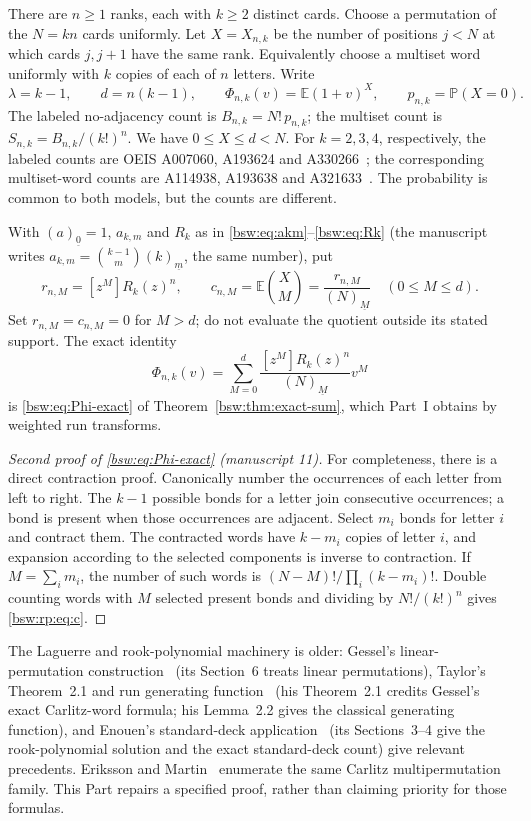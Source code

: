 \documentclass[11pt,letterpaper]{article}
\theoremstyle{definition}
\theoremstyle{remark}
\newcommand{\EE}{\mathbb E}
\newcommand{\PP}{\mathbb P}
\newcommand{\fall}[2]{(#1)_{\underline{#2}}}
\newcommand{\coef}[2]{[#1]#2}
\begin{document}
There are $n\ge1$ ranks, each with $k\ge2$ distinct cards.  Choose a
permutation of the $N=kn$ cards uniformly.  Let $X=X_{n,k}$ be the number
of positions $j<N$ at which cards $j,j+1$ have the same rank.  Equivalently
choose a multiset word uniformly with $k$ copies of each of $n$ letters.
Write
\[
 \lambda=k-1,\qquad d=n(k-1),\qquad
 \Phi_{n,k}(v)=\EE(1+v)^X,\qquad p_{n,k}=\PP(X=0).
\]
The labeled no-adjacency count is $B_{n,k}=N!\,p_{n,k}$; the multiset count
is $S_{n,k}=B_{n,k}/(k!)^n$.  We have $0\le X\le d<N$.  For $k=2,3,4$,
respectively, the labeled counts are OEIS A007060, A193624 and
A330266~\cite{oeis007060,oeis193624,oeis330266}; the corresponding
multiset-word counts are A114938, A193638 and
A321633~\cite{oeis114938,oeis193638,oeis321633}.  The probability is
common to both models, but the counts are different.

With $\fall a0=1$, $a_{k,m}$ and $R_k$ as in
\eqref{bsw:eq:akm}--\eqref{bsw:eq:Rk} (the manuscript writes
$a_{k,m}=\binom{k-1}m\fall km$, the same number), put
\begin{equation}\label{bsw:rp:eq:c}
 r_{n,M}=\coef{z^M}{R_k(z)^n},\qquad
 c_{n,M}=\EE\binom XM=\frac{r_{n,M}}{\fall NM}\quad(0\le M\le d).
\end{equation}
Set $r_{n,M}=c_{n,M}=0$ for $M>d$; do not evaluate the quotient outside its
stated support.  The exact identity
\[
 \Phi_{n,k}(v)=\sum_{M=0}^d\frac{\coef{z^M}{R_k(z)^n}}{\fall NM}v^M
\]
is \eqref{bsw:eq:Phi-exact} of Theorem~\ref{bsw:thm:exact-sum}, which
Part~I obtains by weighted run transforms.

\begin{proof}[Second proof of \eqref{bsw:eq:Phi-exact} (manuscript 11)]
For completeness, there is a direct contraction proof.  Canonically number
the occurrences of each letter from left to right.  The $k-1$ possible bonds
for a letter join consecutive occurrences; a bond is present when those
occurrences are adjacent.  Select $m_i$ bonds for letter $i$ and contract
them.  The contracted words have $k-m_i$ copies of letter $i$, and expansion
according to the selected components is inverse to contraction.  If
$M=\sum_i m_i$, the number of such words is $(N-M)!/\prod_i(k-m_i)!$.
Double counting words with $M$ selected present bonds and dividing by
$N!/(k!)^n$ gives \eqref{bsw:rp:eq:c}.
\end{proof}

The Laguerre and rook-polynomial machinery is older: Gessel's
linear-permutation construction~\cite{gessel} (its Section~6 treats linear
permutations), Taylor's Theorem~2.1 and run generating
function~\cite{taylor} (his Theorem~2.1 credits Gessel's exact Carlitz-word
formula; his Lemma~2.2 gives the classical generating function), and
Enouen's standard-deck application~\cite{enouen} (its Sections~3--4 give
the rook-polynomial solution and the exact standard-deck count) give
relevant precedents.  Eriksson and Martin~\cite{eriksson-martin} enumerate
the same Carlitz multipermutation family.  This Part repairs a specified
proof, rather than claiming priority for those formulas.
\end{document}

